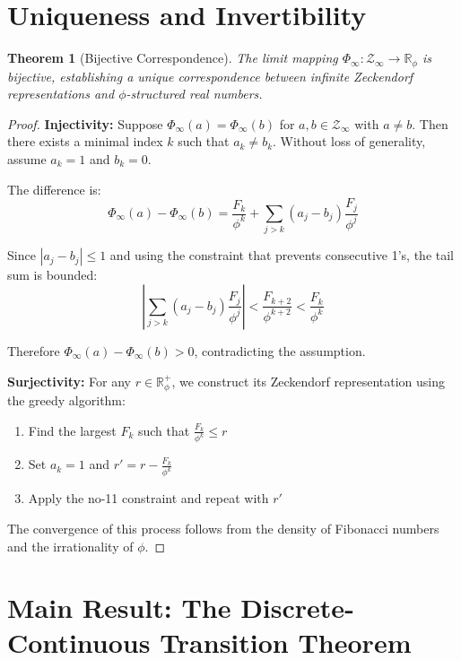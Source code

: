 \documentclass[12pt]{article}
\theoremstyle{plain}
\newtheorem{theorem}{Theorem}[section]
\theoremstyle{definition}
\begin{document}
\section{Uniqueness and Invertibility}

\begin{theorem}[Bijective Correspondence]
\label{thm:bijection}
The limit mapping $\Phi_\infty: \mathcal{Z}_\infty \to \mathbb{R}_\phi$ is bijective, establishing a unique correspondence between infinite Zeckendorf representations and $\phi$-structured real numbers.
\end{theorem}

\begin{proof}
\textbf{Injectivity:}
Suppose $\Phi_\infty(a) = \Phi_\infty(b)$ for $a, b \in \mathcal{Z}_\infty$ with $a \neq b$. Then there exists a minimal index $k$ such that $a_k \neq b_k$. Without loss of generality, assume $a_k = 1$ and $b_k = 0$.

The difference is:
$$\Phi_\infty(a) - \Phi_\infty(b) = \frac{F_k}{\phi^k} + \sum_{j>k} (a_j - b_j) \frac{F_j}{\phi^j}$$

Since $|a_j - b_j| \leq 1$ and using the constraint that prevents consecutive 1's, the tail sum is bounded:
$$\left|\sum_{j>k} (a_j - b_j) \frac{F_j}{\phi^j}\right| < \frac{F_{k+2}}{\phi^{k+2}} < \frac{F_k}{\phi^k}$$

Therefore $\Phi_\infty(a) - \Phi_\infty(b) > 0$, contradicting the assumption.

\textbf{Surjectivity:}
For any $r \in \mathbb{R}_\phi^+$, we construct its Zeckendorf representation using the greedy algorithm:
\begin{enumerate}
\item Find the largest $F_k$ such that $\frac{F_k}{\phi^k} \leq r$
\item Set $a_k = 1$ and $r' = r - \frac{F_k}{\phi^k}$
\item Apply the no-11 constraint and repeat with $r'$
\end{enumerate}

The convergence of this process follows from the density of Fibonacci numbers and the irrationality of $\phi$.
\end{proof}

\section{Main Result: The Discrete-Continuous Transition Theorem}
\end{document}
